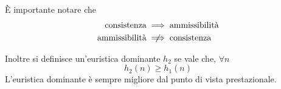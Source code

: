 \documentclass[a4paper, 11pt]{article}
\begin{document}
È importante notare che 
\begin{align*} 
	\text{consistenza} &\implies \text{ammissibilità} \\ 
	\text{ammissibilità} &\centernot\implies \text{consistenza}  
\end{align*}

Inoltre si definisce un'euristica dominante $h_2$ se vale che, $\forall n$ \[ h_2(n) \geq h_1(n) \]
L'euristica dominante è sempre migliore dal punto di vista prestazionale.
\end{document}
